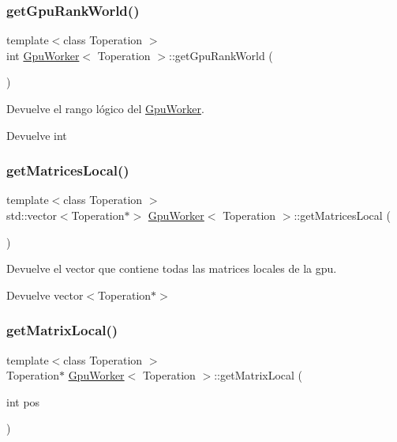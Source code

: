 \subsubsection{\texorpdfstring{get\+Gpu\+Rank\+World()}{getGpuRankWorld()}}
{\footnotesize\ttfamily template$<$class Toperation $>$ \\
int \hyperlink{classGpuWorker}{Gpu\+Worker}$<$ Toperation $>$\+::get\+Gpu\+Rank\+World (\begin{DoxyParamCaption}{ }\end{DoxyParamCaption})}



Devuelve el rango lógico del \hyperlink{classGpuWorker}{Gpu\+Worker}. 

\begin{DoxyReturn}{Devuelve}
int 
\end{DoxyReturn}
\mbox{\label{classGpuWorker_a318e06057a681b2431eee77ccd2da790}} 
\subsubsection{\texorpdfstring{get\+Matrices\+Local()}{getMatricesLocal()}}
{\footnotesize\ttfamily template$<$class Toperation $>$ \\
std\+::vector$<$Toperation$\ast$$>$ \hyperlink{classGpuWorker}{Gpu\+Worker}$<$ Toperation $>$\+::get\+Matrices\+Local (\begin{DoxyParamCaption}{ }\end{DoxyParamCaption})}



Devuelve el vector que contiene todas las matrices locales de la gpu. 

\begin{DoxyReturn}{Devuelve}
vector$<$\+Toperation$\ast$$>$ 
\end{DoxyReturn}
\mbox{\label{classGpuWorker_ac2fab4183f12b93343a5bae16030ba9c}} 
\subsubsection{\texorpdfstring{get\+Matrix\+Local()}{getMatrixLocal()}}
{\footnotesize\ttfamily template$<$class Toperation $>$ \\
Toperation$\ast$ \hyperlink{classGpuWorker}{Gpu\+Worker}$<$ Toperation $>$\+::get\+Matrix\+Local (\begin{DoxyParamCaption}\item[{int}]{pos }\end{DoxyParamCaption})}



